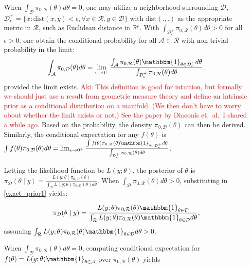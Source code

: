 \documentclass[10pt]{article}
\newcommand{\aki}[1]{\textcolor{red}{Aki: #1}}
\newcommand{\mc}[1]{\mathcal{#1}}
\DeclareMathOperator{\1}{\mathbbm{1}}
\begin{document}
When $ \int_{\mc D} \pi_{0,\mc R}(\theta)d\theta =0$, one may utilize a neighborhood surrounding $\mc D$, $\mc D_\epsilon^+ = \{x: \text{dist}(x,y)<\epsilon, \forall x\in \mc R,y\in \mc D\}$ with $\text{dist}(.,.)$ as the appropriate metric in $\mc R$, such as Euclidean distance in $\mathbb R^p$. With $\int_{\mc D^+_\epsilon} \pi_{0,\mc R}(\theta)d\theta>0$ for all $\epsilon>0$, one obtain the conditional probability for all $\mc A \subset \mc R$ with non-trivial probability in the limit: 
\begin{equation}
\begin{aligned}
\label{exact_prior2}
\int_{\mc A} \pi_{0,\mc D}(\theta) d\theta=\lim_{\epsilon\rightarrow 0^+} \frac{\int_{\mc A} \pi_{0,\mc R}(\theta) \mathbbm{1}_{\theta\in \mc D_\epsilon^+} d\theta}{ \int_{\mc D_\epsilon^+} \pi_{0,\mc R}(\theta)d\theta },
\end{aligned}
\end{equation}
provided the limit exists. \aki{This definition is good for intuition, but formally we should just use a result from geometric measure theory and define an intrinsic prior as a conditional distribution on a manifold. (We then don't have to worry about whether the limit exists or not.) See the paper by Diaconis et.\ al.\ I shared a while ago.} Based on the probability, the density $\pi_{0,\mc D}(\theta)$ can then be derived. Similarly, the conditional expectation for any $f(\theta)$ is $\int f(\theta)\pi_{0,\mc D}(\theta) d\theta=\lim_{\epsilon\rightarrow 0^+} \frac{\int f(\theta) \pi_{0,\mc R}(\theta) \mathbbm{1}_{\theta\in \mc D_\epsilon^+} d\theta}{ \int_{\mc D_\epsilon^+} \pi_{0,\mc R}(\theta)d\theta }$.

Letting the likelihood function be $L(y;\theta)$, the posterior of $\theta$ is ${\pi}_{\mc D}(\theta \mid y) = \frac{ L(y;\theta) \pi_{0,\mc D}(\theta)}{{\int_\mc D}L(y;\theta) \pi_{0,\mc D}(\theta)d\theta}$. When $\int_{\mc D} \pi_{0,\mc R}(\theta)d\theta >0$, substituting in \eqref{exact_prior1} yields:

\begin{equation}
\label{exact_posterior1}
	{\pi}_{\mc D}(\theta \mid y) = \frac{ L(y;\theta)\pi_{0,\mc R}(\theta)\mathbbm{1}_{\theta\in \mc D} }{ \int_{\mc R} L(y;\theta)\pi_{0,\mc R}(\theta) \mathbbm{1}_{\theta\in \mc D}d\theta },
\end{equation}
assuming $\int_{\mc R} L(y;\theta)\pi_{0,\mc R}(\theta) \mathbbm{1}_{\theta\in \mc D}d\theta >0$.

When $\int_{\mc D} \pi_{0,\mc R}(\theta)d\theta =0$, computing conditional expectation for $f(\theta)= L(y;\theta)\mathbbm{1}_{\theta\in \mc A}$ over $\pi_{0,\mc R}(\theta)$ yields 
\end{document}

